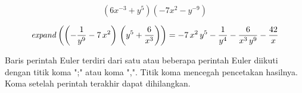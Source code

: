 \documentclass{article}
\begin{document}
\begin{eulernotebook}
\begin{eulercomment}
\end{eulercomment}
\begin{eulerformula}
\[
(6x^{-3}+y^5)(-7x^2-y^{-9})
\]
\end{eulerformula}
\begin{eulerformula}
\[
{\it expand}\left(\left(-\frac{1}{y^9}-7\,x^2\right)\,\left(y^5+  \frac{6}{x^3}\right)\right)=-7\,x^2\,y^5-\frac{1}{y^4}-\frac{6}{x^3  \,y^9}-\frac{42}{x}
\]
\end{eulerformula}
\begin{eulercomment}
\end{eulercomment}
\begin{eulercomment}
Baris perintah Euler terdiri dari satu atau beberapa perintah Euler
diikuti dengan titik koma ";" atau koma ",". Titik koma mencegah
pencetakan hasilnya. Koma setelah perintah terakhir dapat dihilangkan.


\end{eulercomment}
\end{eulernotebook}
\end{document}
